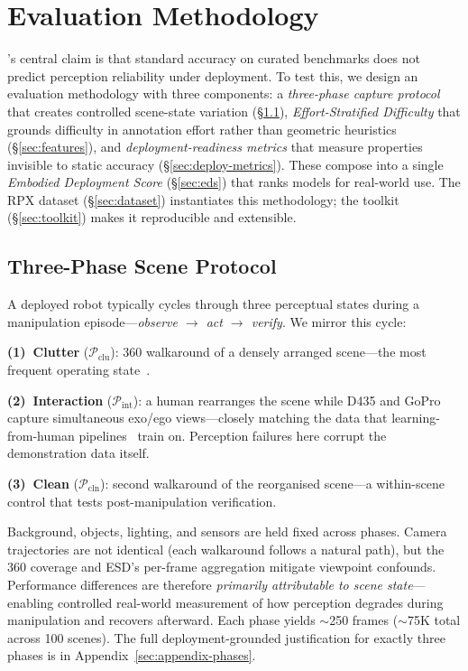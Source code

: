 \section{Evaluation Methodology}\label{sec:method}

\coolname{}'s central claim is that standard accuracy on curated benchmarks does not predict perception reliability under deployment.
To test this, we design an evaluation methodology with three components:
a \textit{three-phase capture protocol} that creates controlled scene-state variation (\S\ref{sec:three-phase}),
\textit{Effort-Stratified Difficulty} that grounds difficulty in annotation effort rather than geometric heuristics (\S\ref{sec:features}),
and \textit{deployment-readiness metrics} that measure properties invisible to static accuracy (\S\ref{sec:deploy-metrics}).
These compose into a single \textit{Embodied Deployment Score} (\S\ref{sec:eds}) that ranks models for real-world use.
The RPX dataset (\S\ref{sec:dataset}) instantiates this methodology; the toolkit (\S\ref{sec:toolkit}) makes it reproducible and extensible.

\subsection{Three-Phase Scene Protocol}
\label{sec:three-phase}

A deployed robot typically cycles through three perceptual states during a manipulation episode---\textit{observe $\to$ act $\to$ verify}.
We mirror this cycle:

\textbf{(1)~Clutter} ($\mathcal{P}_{\text{clu}}$):
360\textdegree{} walkaround of a densely arranged scene---the most frequent operating state~\citep{liu2024okrobot, khazatsky2024droid}.

\textbf{(2)~Interaction} ($\mathcal{P}_{\text{int}}$):
a human rearranges the scene while D435 and GoPro capture simultaneous exo/ego views---closely matching the data that learning-from-human pipelines~\citep{padalunkal2024iteach, 2025hrt1, nair2022r3m, wang2023mimicplay, bharadhwaj2023zeroshothuman, kareer2024egomimic, shaw2025egodex, khazatsky2024droid} train on.
Perception failures here corrupt the demonstration data itself.

\textbf{(3)~Clean} ($\mathcal{P}_{\text{cln}}$):
second walkaround of the reorganised scene---a within-scene control that tests post-manipulation verification.

Background, objects, lighting, and sensors are held fixed across phases.
Camera trajectories are not identical (each walkaround follows a natural path), but the 360\textdegree{} coverage and ESD's per-frame aggregation mitigate viewpoint confounds.
Performance differences are therefore \textit{primarily attributable to scene state}---enabling controlled real-world measurement of how perception degrades during manipulation and recovers afterward.
Each phase yields ${\sim}$250 frames (${\sim}$75K total across 100 scenes).
The full deployment-grounded justification for exactly three phases is in Appendix~\ref{sec:appendix-phases}.

